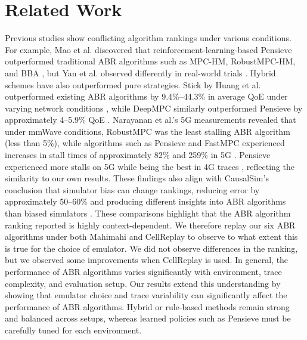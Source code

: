 \section{Related Work}\label{s:related}

Previous studies show conflicting algorithm rankings under various conditions. For example, Mao et al. discovered that reinforcement-learning-based Pensieve outperformed traditional ABR algorithms such as MPC-HM, RobustMPC-HM, and BBA \cite{pensieve-sigcomm}, but Yan et al. observed differently in real-world trials \cite{yan2020-situ}. Hybrid schemes have also outperformed pure strategies. Stick by Huang et al. outperformed existing ABR algorithms by 9.4\%–44.3\% in average QoE under varying network conditions \cite{stick-infocom20}, while DeepMPC similarly outperformed Pensieve by approximately 4–5.9\% QoE \cite{deepmpc-icip20}. Narayanan et al.’s 5G measurements revealed that under mmWave conditions, RobustMPC was the least stalling ABR algorithm (less than 5\%), while algorithms such as Pensieve and FastMPC experienced increases in stall times of approximately 82\% and 259\% in 5G \cite{5g-variegated}. Pensieve experienced more stalls on 5G while being the best in 4G traces \cite{5g-variegated}, reflecting the similarity to our own results. These findings also align with CausalSim’s conclusion that simulator bias can change rankings, reducing error by approximately 50–60\% and producing different insights into ABR algorithms than biased simulators \cite{causalsim-nsdi23}. These comparisons highlight that the ABR algorithm ranking reported is highly context-dependent. We therefore replay our six ABR algorithms under both Mahimahi and CellReplay to observe to what extent this is true for the choice of emulator. We did not observe differences in the ranking, but we observed some improvements when CellReplay is used. In general, the performance of ABR algorithms varies significantly with environment, trace complexity, and evaluation setup. Our results extend this understanding by showing that emulator choice and trace variability can significantly affect the performance of ABR algorithms. 
Hybrid or rule-based methods remain strong and balanced across setups, whereas learned policies such as Pensieve must be carefully tuned for each environment.

